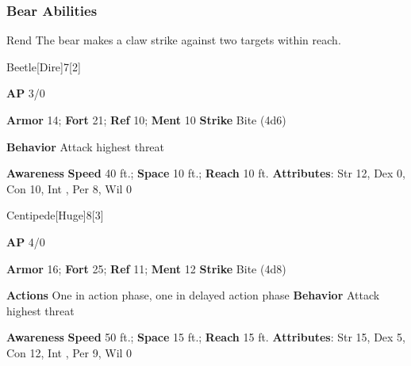 \subsubsection{Bear Abilities}

\begin{freeability}{Rend}
The bear makes a claw strike against two targets within reach.
\end{freeability}

\begin{monsection}{Beetle}[Dire]{7}[2]
\vspace{-1em}\vspace{-1em}
\begin{spellcontent}
\begin{spelltargetinginfo}
{\textbf{AP} 3/0}

\pari \textbf{Armor} 14;
\textbf{Fort} 21;
\textbf{Ref} 10;
\textbf{Ment} 10
\pari \textbf{Strike} Bite  (4d6)



\pari \textbf{Behavior} Attack highest threat
\end{spelltargetinginfo}
\end{spellcontent}

\begin{monsterfooter}
\pari \textbf{Awareness} 
\pari \textbf{Speed} 40 ft.;
\textbf{Space} 10 ft.;
\textbf{Reach} 10 ft.
\pari \textbf{Attributes}:
Str 12,
Dex 0,
Con 10,
Int ,
Per 8,
Wil 0
\end{monsterfooter}
\end{monsection}

\begin{monsection}{Centipede}[Huge]{8}[3]
\vspace{-1em}\vspace{-1em}
\begin{spellcontent}
\begin{spelltargetinginfo}
{\textbf{AP} 4/0}

\pari \textbf{Armor} 16;
\textbf{Fort} 25;
\textbf{Ref} 11;
\textbf{Ment} 12
\pari \textbf{Strike} Bite  (4d8)


\pari \textbf{Actions} One in action phase, one in delayed action phase
\pari \textbf{Behavior} Attack highest threat
\end{spelltargetinginfo}
\end{spellcontent}

\begin{monsterfooter}
\pari \textbf{Awareness} 
\pari \textbf{Speed} 50 ft.;
\textbf{Space} 15 ft.;
\textbf{Reach} 15 ft.
\pari \textbf{Attributes}:
Str 15,
Dex 5,
Con 12,
Int ,
Per 9,
Wil 0
\end{monsterfooter}
\end{monsection}

